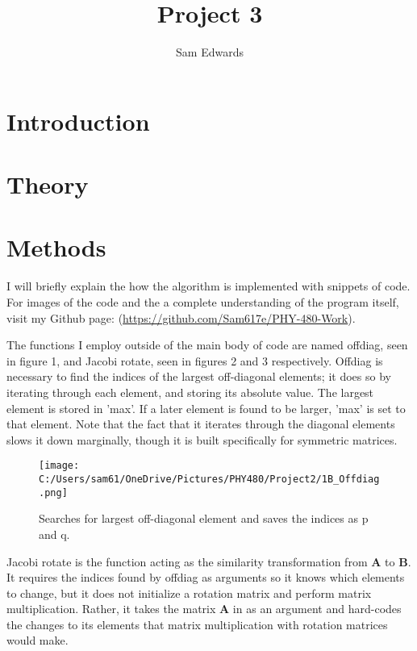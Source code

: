 \documentclass[10pt,showpacs,preprintnumbers,footinbib,amsmath,amssymb,aps,prl,twocolumn,groupedaddress,superscriptaddress,showkeys]{revtex4-1}
\begin{document}
\title{Project 3}
\author{Sam Edwards}
\begin{abstract}

\end{abstract}
\maketitle

\section{Introduction}


\section{Theory}
	
\section{Methods}

I will briefly explain the how the algorithm is implemented with snippets of code. For images of the code and the a complete understanding of the program itself, visit my Github page: (\url{https://github.com/Sam617e/PHY-480-Work}).

The functions I employ outside of the main body of code are named offdiag, seen in figure 1, and Jacobi rotate, seen in figures 2 and 3 respectively. Offdiag is necessary to find the indices of the largest off-diagonal elements; it does so by iterating through each element, and storing its absolute value. The largest element is stored in 'max'. If a later element is found to be larger, 'max' is set to that element. Note that the fact that it iterates through the diagonal elements slows it down marginally, though it is built specifically for symmetric matrices.

\begin{figure}[!ht]
	\centering
	\texttt{[image: C:/Users/sam61/OneDrive/Pictures/PHY480/Project2/1B\_Offdiag.png]}
	\label{uvx}
	\caption{Searches for largest off-diagonal element and saves the indices as p and q.}
\end{figure}

Jacobi rotate is the function acting as the similarity transformation from ${\mathbf A}$ to ${\mathbf B}$. It requires the indices found by offdiag as arguments so it knows which elements to change, but it does not initialize a rotation matrix and perform matrix multiplication. Rather, it takes the matrix ${\mathbf A}$ in as an argument and hard-codes the changes to its elements that matrix multiplication with rotation matrices would make.
\end{document}
